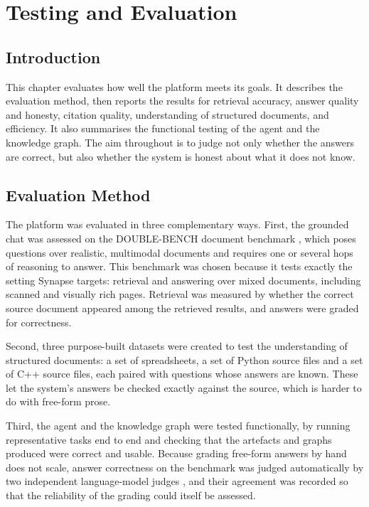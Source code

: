 \chapter{Testing and Evaluation}
\label{ch:evaluation}

\section{Introduction}

This chapter evaluates how well the platform meets its goals. It describes the
evaluation method, then reports the results for retrieval accuracy, answer quality
and honesty, citation quality, understanding of structured documents, and
efficiency. It also summarises the functional testing of the agent and the
knowledge graph. The aim throughout is to judge not only whether the answers are
correct, but also whether the system is honest about what it does not know.

\section{Evaluation Method}

The platform was evaluated in three complementary ways. First, the grounded chat
was assessed on the DOUBLE-BENCH document benchmark \cite{shen2025doublebench},
which poses questions over realistic, multimodal documents and requires one or
several hops of reasoning to answer. This benchmark was chosen because it tests
exactly the setting Synapse targets: retrieval and answering over mixed documents,
including scanned and visually rich pages. Retrieval was measured by whether the
correct source document appeared among the retrieved results, and answers were
graded for correctness.

Second, three purpose-built datasets were created to test the understanding of
structured documents: a set of spreadsheets, a set of Python source files and a
set of C++ source files, each paired with questions whose answers are known. These
let the system's answers be checked exactly against the source, which is harder to
do with free-form prose.

Third, the agent and the knowledge graph were tested functionally, by running
representative tasks end to end and checking that the artefacts and graphs produced
were correct and usable. Because grading free-form answers by hand does not scale,
answer correctness on the benchmark was judged automatically by two independent
language-model judges \cite{zheng2023judge}, and their agreement was recorded so
that the reliability of the grading could itself be assessed.

